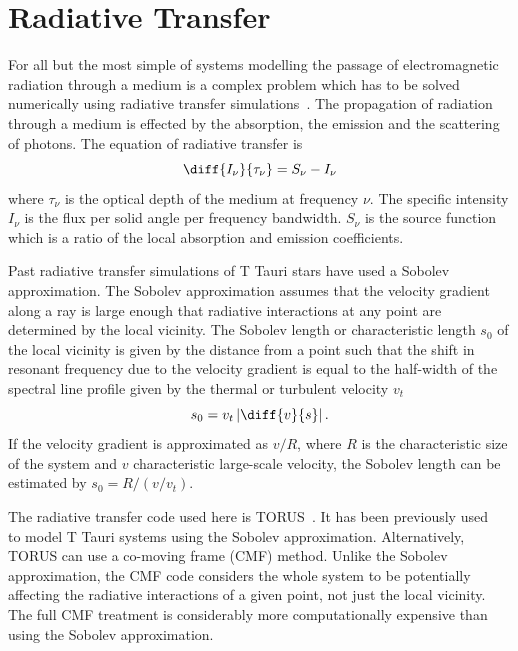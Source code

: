 \documentclass[fleqn,usenatbib]{mnras}
\begin{document}
\section{Radiative Transfer}
\label{sec:radiative}
For all but the most simple of systems modelling the passage of electromagnetic radiation through a medium is a complex problem which has to be solved numerically using radiative transfer simulations~\citep[see][]{2013ARA&A..51...63S}. The propagation of radiation through a medium is effected by the absorption, the emission and the scattering of photons. The equation of radiative transfer is
\begin{equation}
    \diff{I_{\nu}}{\tau_{\nu}} = S_{\nu} - I_{\nu}
\label{eq:RT}
\end{equation}
where $\tau_{\nu}$ is the optical depth of the medium at frequency $\nu$. The specific intensity $I_{\nu}$ is the flux per solid angle per frequency bandwidth. $S_{\nu}$ is the source function which is a ratio of the local absorption and emission coefficients.


Past radiative transfer simulations of T Tauri stars have used a Sobolev approximation. The Sobolev approximation assumes that the velocity gradient along a ray is large enough that radiative interactions at any point are determined by the local vicinity. The Sobolev length  or characteristic length $s_0$ of the local vicinity is given by the distance from a point such that the shift in resonant frequency due to the velocity gradient is equal to the half-width of the spectral line profile given by the thermal or turbulent velocity $v_t$
\begin{equation}
    s_0 = v_t \left|\diff{v}{s}\right|{\rm .}
    \label{eq:sobolevlength}
\end{equation}
If the velocity gradient is approximated as $v/R$, where $R$ is the characteristic size of the system and $v$ characteristic large-scale velocity, the Sobolev length can be estimated by $s_0 = R/(v/v_t)$.

The radiative transfer code used here is TORUS~\citep{2019A&C....27...63H}. It has been previously used~\citep[e.g.][]{2005MNRAS.356.1489S} to model T Tauri systems using the Sobolev approximation. Alternatively, TORUS can use a co-moving frame (CMF) method. Unlike the Sobolev approximation, the CMF code considers the whole system to be potentially affecting the radiative interactions of a given point, not just the local vicinity. The full CMF treatment is considerably more computationally expensive than using the Sobolev approximation.
\end{document}
